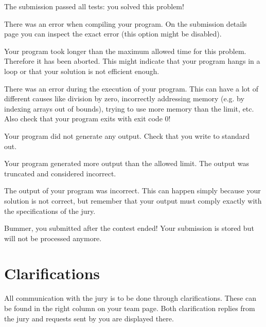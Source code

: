 \begin{description}[\setleftmargin{4.5cm}]
\item[CORRECT]
The submission passed all tests: you solved this problem!

\item[COMPILER-ERROR]
There was an error when compiling your program. On the submission
details page you can inspect the exact error (this option might be
disabled).

\item[TIMELIMIT]
Your program took longer than the maximum allowed time for this
problem. Therefore it has been aborted. This might indicate that your
program hangs in a loop or that your solution is not efficient
enough.

\item[RUN-ERROR]
There was an error during the execution of your program. This can have
a lot of different causes like division by zero, incorrectly
addressing memory (e.g. by indexing arrays out of bounds), trying to
use more memory than the limit, etc.
Also check that your program exits with exit code 0!

\item[NO-OUTPUT]
Your program did not generate any output. Check that you write to
standard out.

\item[OUTPUT-LIMIT]
Your program generated more output than the allowed limit. The output
was truncated and considered incorrect.

\item[WRONG-ANSWER]
The output of your program was incorrect. This can happen simply
because your solution is not correct, but remember that your output
must comply exactly with the specifications of the jury.

\item[TOO-LATE]
Bummer, you submitted after the contest ended! Your submission is
stored but will not be processed anymore.
\end{description}

\section{Clarifications}

All communication with the jury is to be done through clarifications.
These can be found in the right column on your team page. Both
clarification replies from the jury and requests sent by you
are displayed there.


